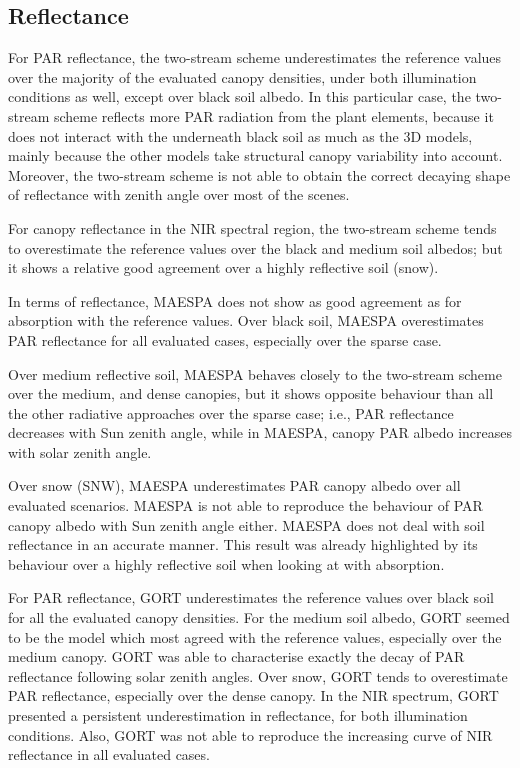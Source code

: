 \documentclass[a4paper,11pt]{report}
\begin{document}
\subsection{Reflectance}

For PAR reflectance, the two-stream scheme underestimates the reference values over the majority of the evaluated canopy densities, under both illumination conditions as well, except over black soil albedo. In this particular case, the two-stream scheme reflects more PAR radiation from the plant elements, because it does not interact with the underneath black soil as much as the 3D models, mainly because the other models take structural canopy variability into account. Moreover, the two-stream scheme is not able to obtain the correct decaying shape of reflectance with zenith angle over most of the scenes.

For canopy reflectance in the NIR spectral region, the two-stream scheme tends to overestimate the reference values over the black and medium soil albedos; but it shows a relative good agreement over a highly reflective soil (snow).

In terms of reflectance, MAESPA does not show as good agreement as for absorption with the reference values. Over black soil, MAESPA overestimates PAR reflectance for all evaluated cases, especially over the sparse case.

Over medium reflective soil, MAESPA behaves closely to the two-stream scheme over the medium, and dense canopies, but it shows opposite behaviour than all the other radiative approaches over the sparse case; i.e., PAR reflectance decreases with Sun zenith angle, while in MAESPA, canopy PAR albedo increases with solar zenith angle. 

Over snow (SNW), MAESPA underestimates PAR canopy albedo over all evaluated scenarios. MAESPA is not able to reproduce the behaviour of PAR canopy albedo with Sun zenith angle either. MAESPA does not deal with soil reflectance in an accurate manner. This result was already highlighted by its behaviour over a highly reflective soil when looking at with absorption. 

For PAR reflectance, GORT underestimates the reference values over black soil for all the evaluated canopy densities. For the medium soil albedo, GORT seemed to be the model which most agreed with the reference values, especially over the medium canopy. GORT was able to characterise exactly the decay of PAR reflectance following solar zenith angles. Over snow, GORT tends to overestimate PAR reflectance, especially over the dense canopy. In the NIR spectrum, GORT presented a persistent underestimation in reflectance, for both illumination conditions. Also, GORT was not able to reproduce the increasing curve of NIR reflectance in all evaluated cases.
\end{document}

